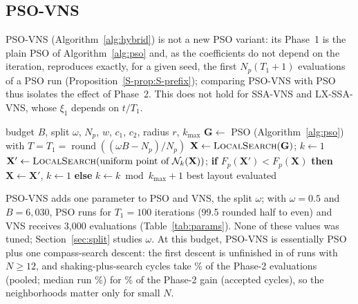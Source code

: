 \subsection{PSO-VNS}
PSO-VNS (Algorithm~\ref{alg:hybrid}) is not a new PSO variant: its Phase~1 is the plain PSO of Algorithm~\ref{alg:pso} and, as the coefficients do not depend on the iteration, reproduces exactly, for a given seed, the first $N_p(T_1+1)$ evaluations of a PSO run (Proposition~\ref{S-prop:S-prefix}); comparing PSO-VNS with PSO thus isolates the effect of Phase~2. This does not hold for SSA-VNS and LX-SSA-VNS, whose $\xi_1$ depends on $t/T_1$.

\begin{algorithm}[!t]
\caption{PSO-VNS for a prescribed turbine count $N$}
\label{alg:hybrid}
\small
\begin{algorithmic}[1]
\Require budget $B$, split $\omega$, $N_p$, $w$, $c_1$, $c_2$, radius $r$, $k_{\max}$
\State $\mathbf G\gets$ PSO (Algorithm~\ref{alg:pso}) with $T=T_1=\operatorname{round}((\omega B-N_p)/N_p)$ 
\State $\mathbf X\gets\textsc{LocalSearch}(\mathbf G)$; $k\gets1$ 
    \State $\mathbf X'\gets\textsc{LocalSearch}(\text{uniform point of }\mathcal N_k(\mathbf X))$; \textbf{if} $F_p(\mathbf X')<F_p(\mathbf X)$ \textbf{then} $\mathbf X\gets \mathbf X'$, $k\gets1$ \textbf{else} $k\gets k\bmod k_{\max}+1$
\EndWhile
\State \Return best layout evaluated
\end{algorithmic}
\end{algorithm}


PSO-VNS adds one parameter to PSO and VNS, the split $\omega$; with $\omega=0.5$ and $B=6{,}030$, PSO runs for $T_1=100$ iterations (99.5 rounded half to even) and VNS receives 3,000 evaluations (Table~\ref{tab:params}). None of these values was tuned; Section~\ref{sec:split} studies $\omega$. At this budget, PSO-VNS is essentially PSO plus one compass-search descent: the first descent is unfinished in \NDDescentUnfinishedLargePSOVNS{} of \NDRunsLargePSOVNS{} runs with $N\ge12$, and shaking-plus-search cycles take \NDCycleEvalsPctPSOVNS\% of the Phase-2 evaluations (pooled; median run \NDCycleEvalsPctMedianPSOVNS\%) for \NDCycleSharePSOVNS\% of the Phase-2 gain (accepted cycles), so the neighborhoods matter only for small $N$.

